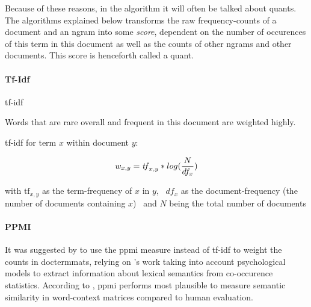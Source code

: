 Because of these reasons, in the algorithm it will often be talked about \glspl{quant}. The algorithms explained below transforms the raw frequency-counts of a document and an \gls{ngram} into some \emph{score}, dependent on the number of occurences of this term in this document as well as the counts of other \glspl{ngram} and other documents. This score is henceforth called a \gls{quant}.

\paragraph{Tf-Idf}

\gls{tf-idf} 

Words that are rare overall and frequent in this document are weighted highly.

tf-idf for term $x$ within document $y$:

$$ w_{x,y} = \text{\textit{tf}}_{x,y} * log(\frac{N}{df_x}) $$

with $\text{tf}_{x,y}$ as the term-frequency of $x$ in $y$, \
$df_x$ as the document-frequency (the number of documents containing $x$) \
and $N$ being the total number of documents




\paragraph{PPMI}


It was suggested by \cite{Turney2010} to use the \gls{ppmi} measure instead of tf-idf to weight the counts in \glspl{doctermmat}, relying on \cite{Bullinaria2007}'s work taking into account psychological models to extract information about lexical semantics from co-occurence statistics. According to \cite{Turney2010,Bullinaria2007}, \gls{ppmi} performs most plausible to measure semantic similarity in word-context matrices compared to human evaluation. %



